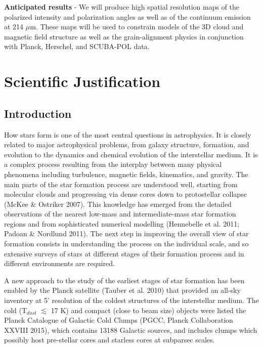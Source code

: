 \documentclass[11pt]{amsart}
\begin{document}
{\bf Anticipated results} - We will produce high spatial resolution maps of the polarized intensity and polarization angles as well as of the 
continuum emission at 214 $\mu$m. 
These maps will be used to constrain models of the 3D cloud and magnetic field structure as well as the grain-alignment physics in conjunction
with Planck, Herschel, and SCUBA-POL data.

\newpage

\section{Scientific Justification}


\subsection{Introduction}

How stars form is one of the most 
central questions in astrophysics.
It is closely related to major astrophysical problems,
from galaxy structure, formation, and evolution to the dynamics
and chemical evolution of the interstellar medium. It is a complex
process resulting from the interplay between many physical
phenomena including turbulence, magnetic fields, kinematics,
and gravity. 
The main parts of the star formation process are understood well, starting from molecular
clouds and progressing via dense cores down to protostellar
collapse (McKee \& Ostriker 2007). This knowledge has
emerged from the detailed observations of the nearest low-mass
and intermediate-mass star formation regions and
from sophisticated numerical modelling (Hennebelle et al. 2011;
Padoan \& Nordlund 2011). The next step in improving the overall
view of star formation consists in understanding the process
on the individual scale, and so extensive surveys of stars at different
stages of their formation process and in different environments
are required.

A new approach to the study of the earliest stages of star formation
has been enabled by the Planck satellite (Tauber et al.
2010) that provided
an all-sky inventory at 5' resolution
of the coldest structures of the interstellar
medium. 
The cold (T$_{dust}$ $\lesssim$ 17 K) and compact (close to beam
size) objects were listed the Planck Catalogue of Galactic Cold Clumps (PGCC, Planck
Collaboration XXVIII 2015), which contains 13188 Galactic
sources, and 
includes clumps
which possibly host pre-stellar cores and starless cores at subparsec
scales. 
\end{document}
